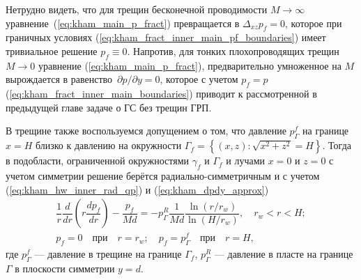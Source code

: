 \documentclass{article}
\newcommand{\mysub}[1]{%
  \par\vspace{0.5em}\noindent{\normalsize\underline{#1}}\par\vspace{0.5em}%
}
\begin{document}
Нетрудно видеть, что для трещин бесконечной проводимости $M \to \infty$ уравнение~(\ref{eq:kham_main_p_fract})
превращается в $\Delta_{xz} p_f = 0$, которое при граничных
условиях (\ref{eq:kham_fract_inner_main_pf_boundaries}) имеет тривиальное решение $p_f \equiv 0$.
Напротив, для тонких плохопроводящих трещин $M \to 0$ уравнение (\ref{eq:kham_main_p_fract}),
предварительно умноженное на $M$ вырождается в равенство~$\partial p/\partial y = 0$, которое
с учетом $p_f = p$ (\ref{eq:kham_fract_inner_main_boundaries}) приводит к рассмотренной в
предыдущей главе задаче о ГС без трещин ГРП.

\mysub{Подобласть (I) $r_w \leq x < H$}
В трещине также воспользуемся допущением о том, что давление $p^f_{\Gamma}$ на
границе $x=H$ близко к давлению на окружности $\Gamma_f=\left\{\left(x,z\right): \sqrt{x^2 + z^2} = H \right\}$. %
Тогда в подобласти, ограниченной окружностями $\gamma_f$ и $\Gamma_f$ и лучами $x=0$ и $z=0$
с учетом симметрии решение берётся радиально-симметричным и с учетом (\ref{eq:kham_hw_inner_rad_qp}) и (\ref{eq:kham_dpdy_approx})
\begin{equation}
	\displaystyle
	\begin{gathered}
		\dfrac{1}{r}\dfrac{d}{dr}\left(r\dfrac{d p_f}{dr}\right) - \dfrac{p_f}{Md} =
		- p^R_{\Gamma}\dfrac{1}{Md} \dfrac{\ln{\left(r/r_w\right)}}{\ln{\left(H/r_w\right)}}, \quad r_w < r < H;    \\[8pt]
		p_f = 0 \quad \text{при} \quad r = r_w; \quad p_f = p^f_{\Gamma} \quad \text{при} \quad r = H,
	\end{gathered}
	\label{eq:kham_fract_inner_area_I_press_equation}
\end{equation}
где $p^f_{\Gamma}$ — давление в трещине на границе $\Gamma_f$, $p^R_{\Gamma}$ — давление в
пласте на границе $\Gamma$ в плоскости симметрии $y=d$.
\end{document}
